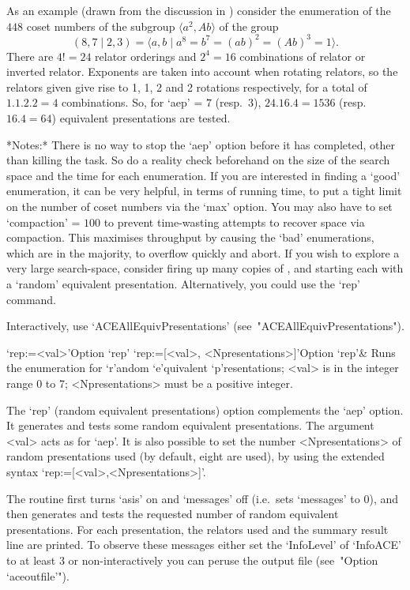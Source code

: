 As an example (drawn from the discussion in \cite{HR99a}) consider the
enumeration   of   the   $448$   coset   numbers   of   the   subgroup
$\langle  a^2,Ab \rangle$ of the group
$$ (8,7 \mid 2,3) 
    = \langle a,b \mid a^8 = b^7 = (ab)^2 = (Ab)^3 = 1 \rangle. $$
There are $4!=24$  relator  orderings  and  $2^4=16$  combinations  of
relator or inverted relator. Exponents are  taken  into  account  when
rotating relators, so the relators given give rise to 1, 1,  2  and  2
rotations respectively, for a total of $1.1.2.2=4$  combinations.  So,
for  `aep'  =  $7$   (resp.~$3$),   $24.16.4=1536$   (resp.~$16.4=64$)
equivalent presentations are tested.

*Notes:*
There is no way to stop the `aep'  option  before  it  has  completed,
other than killing the task. So do a reality check beforehand  on  the
size of the search space and the time for each enumeration. If you are
interested in  finding  a  \lq{}good'  enumeration,  it  can  be  very
helpful, in terms of running time, to put a tight limit on the  number
of coset numbers via the `max'  option.  You  may  also  have  to  set
`compaction' = $100$ to prevent time-wasting attempts to recover space
via compaction. This maximises throughput  by  causing  the  \lq{}bad'
enumerations, which are in  the  majority,  to  overflow  quickly  and
abort. If you wish to explore  a  very  large  search-space,  consider
firing up many copies of {\ACE}, and starting each with a \lq{}random'
equivalent  presentation.  Alternatively,  you  could  use  the  `rep'
command.

Interactively,             use              `ACEAllEquivPresentations'
(see~"ACEAllEquivPresentations").

\>`rep:=<val>'{Option `rep'}
\>`rep:=[<val>, <Npresentations>]'{Option `rep'}&
Runs  the enumeration for `r'andom `e'quivalent `p'resentations;
<val> is in the integer range 0 to 7;
<Npresentations> must be a positive integer.

The `rep' (random equivalent  presentations)  option  complements  the
`aep'  option.  It  generates  and  tests   some   random   equivalent
presentations. The argument <val>  acts  as  for  `aep'.  It  is  also
possible to set the number <Npresentations>  of  random  presentations
used (by default, eight  are  used),  by  using  the  extended  syntax
`rep:=[<val>,<Npresentations>]'.

The routine first  turns  `asis'  on  and  `messages'  off  (i.e.~sets
`messages' to 0), and then generates and tests the requested number of
random equivalent presentations. For each presentation,  the  relators
used and the  summary  result  line  are  printed.  To  observe  these
messages either set the `InfoLevel' of `InfoACE'  to  at  least  3  or
non-interactively you can peruse the {\ACE} output  file  (see~"Option
`aceoutfile'").

